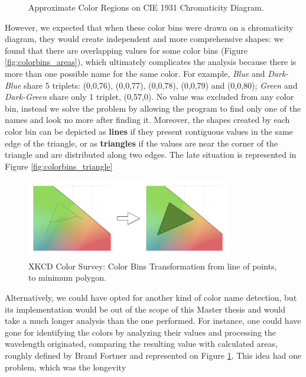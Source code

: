 \begin{figure}
\begin{minipage}{0.45\textwidth}
    \caption[Approximate Color Regions on CIE 1931 Chromaticity Diagram]{Approximate Color Regions on CIE 1931 Chromaticity Diagram. \cite{Fortner1997}}
    \label{fig:cie_colorregions}
  \end{minipage}
\end{figure}
%
However, we expected that when these color bins were drawn on a chromaticity diagram, they would create independent and more comprehensive shapes: we found that there are overlapping
values for some color bins (Figure \ref{fig:colorbins_areas}), which ultimately complicates the analysis because there is more than one possible name for the same color. For example, \emph{Blue} and \emph{Dark-Blue}
share 5 triplets: (0,0,76), (0,0,77), (0,0,78), (0,0,79) and (0,0,80); \emph{Green} and \emph{Dark-Green} share only 1 triplet, (0,57,0). No value was excluded from any color bin,
instead we solve the problem by allowing the program to find only one of the names and look no more after finding it. Moreover, the shapes created by each color bin can be depicted as \textbf{lines}
if they present contiguous values in the same edge of the triangle, or as \textbf{triangles} if the values are near the corner of the triangle and are distributed along two edges. The late situation is
represented in Figure \ref{fig:colorbins_triangle}\par
%
\begin{figure}
  \centering
  \includegraphics[width=0.8\textwidth]{images/colorbins_transformation.png}
  \caption[XKCD Color Survey: Color Bins Transformation]{XKCD Color Survey: Color Bins Transformation from line of points, to minimum polygon.}
  \label{fig:colornames_xkcd}
\end{figure} \par
%
Alternatively, we could have opted for another kind of color name detection, but its implementation would be out of the scope of this Master thesis and would take a much longer
analysis than the one performed. For instance, one could have gone for identifying the colors by analyzing their values and processing the wavelength originated, comparing the resulting
value with calculated areas, roughly defined by Brand Fortner \cite{Fortner1997} and represented on Figure \ref{fig:cie_colorregions}. This idea had one problem, which was the longevity
